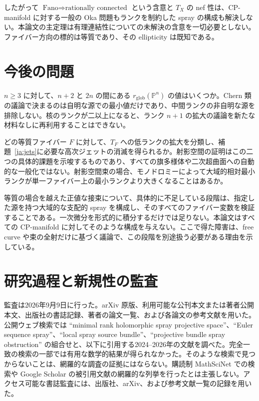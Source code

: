 \documentclass[12pt]{amsart}
\theoremstyle{definition}
\theoremstyle{remark}
\numberwithin{equation}{section}
\newcommand{\mP}{\mathbb{P}}
\begin{document}
したがって $\text{Fano}\Rightarrow\text{rationally connected}$ という含意と $T_X$ の nef 性は、CP-manifold に対する一般の Oka 問題もランクを制約した spray の構成も解決しない。本論文の主定理は有理連結性についての未解決の含意を一切必要としない。ファイバー方向の標的は等質であり、その ellipticity は既知である。

\section{今後の問題}
$n\geq3$ に対して、$n+2$ と $2n$ の間にある $r_{\mathrm{glob}}(\mP^n)$ の値はいくつか。Chern 類の議論で決まるのは自明な源での最小値だけであり、中間ランクの非自明な源を排除しない。核のランクが二以上になると、ランク $n+1$ の拡大の議論を新たな材料なしに再利用することはできない。

どの等質ファイバー $F$ に対して、$T_F$ への低ランクの拡大を分類し、補題~\ref{ja:jets}に必要な高次ジェットの消滅を得られるか。射影空間の証明はこの二つの具体的課題を示唆するものであり、すべての旗多様体や二次超曲面への自動的な一般化ではない。射影空間束の場合、モノドロミーによって大域的相対最小ランクが単一ファイバー上の最小ランクより大きくなることはあるか。

等質の場合を越えた正値な接束について、具体的に不足している段階は、指定した源を持つ大域的な支配的 spray を構成し、そのすべてのファイバー変数を検証することである。一次微分を形式的に積分するだけでは足りない。本論文はすべての CP-manifold に対してそのような構成を与えない。ここで得た障害は、free curve や束の全射だけに基づく議論で、この段階を別途扱う必要がある理由を示している。

\section{研究過程と新規性の監査}\label{ja:audit}
監査は2026年9月9日に行った。arXiv 原版、利用可能な公刊本文または著者公開本文、出版社の書誌記録、著者の論文一覧、および各論文の参考文献を用いた。公開ウェブ検索では ``minimal rank holomorphic spray projective space''、``Euler sequence spray''、``local spray source bundle''、``projective bundle spray obstruction'' の組合せと、以下に引用する2024--2026年の文献を調べた。完全一致の検索の一部では有用な数学的結果が得られなかった。そのような検索で見つからないことは、網羅的な調査の証拠にはならない。購読制 MathSciNet での検索や Google Scholar の被引用文献の網羅的な列挙を行ったとは主張しない。アクセス可能な書誌監査には、出版社、arXiv、および参考文献一覧の記録を用いた。
\end{document}
